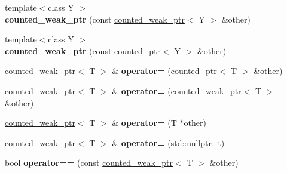 \begin{DoxyCompactItemize}
\item 
\hypertarget{classcounted__weak__ptr_a1e2e7237803be43333f33ca04a7f37b5}{}{\footnotesize template$<$class Y $>$ }\\{\bfseries counted\+\_\+weak\+\_\+ptr} (const \hyperlink{classcounted__weak__ptr}{counted\+\_\+weak\+\_\+ptr}$<$ Y $>$ \&other)\label{classcounted__weak__ptr_a1e2e7237803be43333f33ca04a7f37b5}

\item 
\hypertarget{classcounted__weak__ptr_aa3536dddff6b90bf83f74a16016be615}{}{\footnotesize template$<$class Y $>$ }\\{\bfseries counted\+\_\+weak\+\_\+ptr} (const \hyperlink{classcounted__ptr}{counted\+\_\+ptr}$<$ Y $>$ \&other)\label{classcounted__weak__ptr_aa3536dddff6b90bf83f74a16016be615}

\item 
\hypertarget{classcounted__weak__ptr_adc24bd1e1e2dfb696da7a95a17c14b2f}{}\hyperlink{classcounted__weak__ptr}{counted\+\_\+weak\+\_\+ptr}$<$ T $>$ \& {\bfseries operator=} (\hyperlink{classcounted__ptr}{counted\+\_\+ptr}$<$ T $>$ \&other)\label{classcounted__weak__ptr_adc24bd1e1e2dfb696da7a95a17c14b2f}

\item 
\hypertarget{classcounted__weak__ptr_a826c91a8d2473da327fc2bb13e060c93}{}\hyperlink{classcounted__weak__ptr}{counted\+\_\+weak\+\_\+ptr}$<$ T $>$ \& {\bfseries operator=} (\hyperlink{classcounted__weak__ptr}{counted\+\_\+weak\+\_\+ptr}$<$ T $>$ \&other)\label{classcounted__weak__ptr_a826c91a8d2473da327fc2bb13e060c93}

\item 
\hypertarget{classcounted__weak__ptr_a5aad63271586e4e51f69caf2180afa36}{}\hyperlink{classcounted__weak__ptr}{counted\+\_\+weak\+\_\+ptr}$<$ T $>$ \& {\bfseries operator=} (T $\ast$other)\label{classcounted__weak__ptr_a5aad63271586e4e51f69caf2180afa36}

\item 
\hypertarget{classcounted__weak__ptr_af703d3e957972a516f0128ab578ecfda}{}\hyperlink{classcounted__weak__ptr}{counted\+\_\+weak\+\_\+ptr}$<$ T $>$ \& {\bfseries operator=} (std\+::nullptr\+\_\+t)\label{classcounted__weak__ptr_af703d3e957972a516f0128ab578ecfda}

\item 
\hypertarget{classcounted__weak__ptr_a5c1203fe6b79b6494dc6fea0734cd9e4}{}bool {\bfseries operator==} (const \hyperlink{classcounted__weak__ptr}{counted\+\_\+weak\+\_\+ptr}$<$ T $>$ \&other)\label{classcounted__weak__ptr_a5c1203fe6b79b6494dc6fea0734cd9e4}


\end{DoxyCompactItemize}
